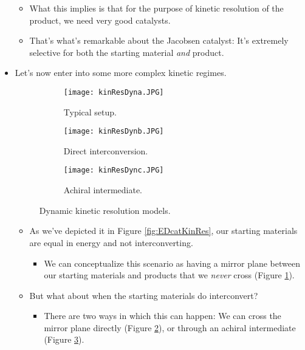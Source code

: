 \documentclass[../notes.tex]{subfiles}
\begin{document}
\begin{itemize}
\begin{itemize}
        \item What this implies is that for the purpose of kinetic resolution of the product, we need very good catalysts.
        \item That's what's remarkable about the Jacobsen catalyst: It's extremely selective for both the starting material \emph{and} product.
    \end{itemize}
    \item Let's now enter into some more complex kinetic regimes.
    \begin{figure}[h!]
        \centering
        \begin{subfigure}[b]{0.25\linewidth}
            \centering
            \texttt{[image: kinResDyna.JPG]}
            \caption{Typical setup.}
            \label{fig:kinResDyna}
        \end{subfigure}
        \begin{subfigure}[b]{0.25\linewidth}
            \centering
            \texttt{[image: kinResDynb.JPG]}
            \caption{Direct interconversion.}
            \label{fig:kinResDynb}
        \end{subfigure}
        \begin{subfigure}[b]{0.25\linewidth}
            \centering
            \texttt{[image: kinResDync.JPG]}
            \caption{Achiral intermediate.}
            \label{fig:kinResDync}
        \end{subfigure}
        \caption{Dynamic kinetic resolution models.}
        \label{fig:kinResDyn}
    \end{figure}
    \pagebreak
    \begin{itemize}
        \item As we've depicted it in Figure \ref{fig:EDcatKinRes}, our starting materials are equal in energy and not interconverting.
        \begin{itemize}
            \item We can conceptualize this scenario as having a mirror plane between our starting materials and products that we \emph{never} cross (Figure \ref{fig:kinResDyna}).
        \end{itemize}
        \item But what about when the starting materials do interconvert?
        \begin{itemize}
            \item There are two ways in which this can happen: We can cross the mirror plane directly (Figure \ref{fig:kinResDynb}), or through an achiral intermediate (Figure \ref{fig:kinResDync}).

\end{itemize}
\end{itemize}
\end{itemize}
\end{document}
